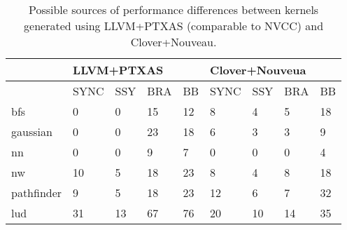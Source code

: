 \begin{table*}[h!]
\centering
\begin{tabular}{@{}lllllllll@{}}
\toprule
           & \multicolumn{4}{l}{LLVM+PTXAS} & \multicolumn{4}{l}{Clover+Nouveua} \\ \midrule
           & SYNC    & SSY   & BRA   & BB   & SYNC     & SSY    & BRA    & BB    \\
bfs        & 0       & 0     & 15    & 12   & 8        & 4      & 5      & 18    \\
gaussian   & 0       & 0     & 23    & 18   & 6        & 3      & 3      & 9     \\
nn         & 0       & 0     & 9     & 7    & 0        & 0      & 0      & 4     \\
nw         & 10      & 5     & 18    & 23   & 8        & 4      & 8      & 18    \\
pathfinder & 9       & 5     & 18    & 23   & 12       & 6      & 7      & 32    \\
lud        & 31      & 13    & 67    & 76   & 20       & 10     & 14     & 35    \\ \bottomrule
\end{tabular}
\caption{\footnotesize{Possible sources of performance differences between kernels generated using LLVM+PTXAS (comparable to NVCC) and Clover+Nouveau.}}
\label{tab:sassdiferences}
\end{table*}